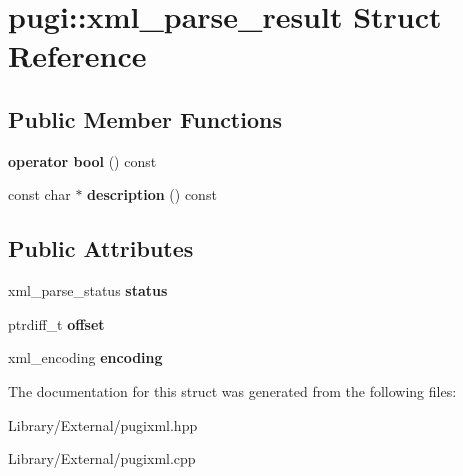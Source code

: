 \hypertarget{structpugi_1_1xml__parse__result}{}\section{pugi\+:\+:xml\+\_\+parse\+\_\+result Struct Reference}
\label{structpugi_1_1xml__parse__result}
\subsection*{Public Member Functions}
\begin{DoxyCompactItemize}
\item 
\hypertarget{structpugi_1_1xml__parse__result_a1fd8f66dd233df5f76f63dea8627e589}{}{\bfseries operator bool} () const \label{structpugi_1_1xml__parse__result_a1fd8f66dd233df5f76f63dea8627e589}

\item 
\hypertarget{structpugi_1_1xml__parse__result_add183854c1798f4c8ae74f40def79b03}{}const char $\ast$ {\bfseries description} () const \label{structpugi_1_1xml__parse__result_add183854c1798f4c8ae74f40def79b03}

\end{DoxyCompactItemize}
\subsection*{Public Attributes}
\begin{DoxyCompactItemize}
\item 
\hypertarget{structpugi_1_1xml__parse__result_af8b3e6badea671931017695c8a9dd1af}{}xml\+\_\+parse\+\_\+status {\bfseries status}\label{structpugi_1_1xml__parse__result_af8b3e6badea671931017695c8a9dd1af}

\item 
\hypertarget{structpugi_1_1xml__parse__result_adb61df40459ba6fb1083d22467983086}{}ptrdiff\+\_\+t {\bfseries offset}\label{structpugi_1_1xml__parse__result_adb61df40459ba6fb1083d22467983086}

\item 
\hypertarget{structpugi_1_1xml__parse__result_ad11f279dfce644dfe297e24dc5f72c01}{}xml\+\_\+encoding {\bfseries encoding}\label{structpugi_1_1xml__parse__result_ad11f279dfce644dfe297e24dc5f72c01}

\end{DoxyCompactItemize}


The documentation for this struct was generated from the following files\+:\begin{DoxyCompactItemize}
\item 
Library/\+External/pugixml.\+hpp\item 
Library/\+External/pugixml.\+cpp\end{DoxyCompactItemize}
